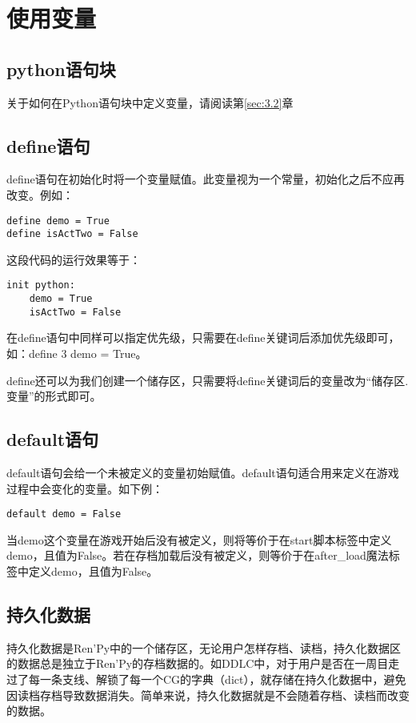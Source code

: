 \section{使用变量}
\subsection{python语句块}
关于如何在Python语句块中定义变量，请阅读第\ref{sec:3.2}章
\subsection{define语句}
define语句在初始化时将一个变量赋值。此变量视为一个常量，初始化之后不应再改变。例如：

\begin{lstlisting}
define demo = True
define isActTwo = False
\end{lstlisting}

这段代码的运行效果等于：
\begin{lstlisting}
init python:
    demo = True
    isActTwo = False
\end{lstlisting}

\begin{ExtraKnowledge}
    在define语句中同样可以指定优先级，只需要在define关键词后添加优先级即可，如：define 3 demo = True。
\end{ExtraKnowledge}

define还可以为我们创建一个储存区，只需要将define关键词后的变量改为“储存区.变量”的形式即可。

\subsection{default语句}
default语句会给一个未被定义的变量初始赋值。default语句适合用来定义在游戏过程中会变化的变量。如下例：
\begin{lstlisting}[numbers=none]
default demo = False
\end{lstlisting}

当demo这个变量在游戏开始后没有被定义，则将等价于在start脚本标签中定义demo，且值为False。若在存档加载后没有被定义，则等价于在after\_load魔法标签中定义demo，且值为False。

\subsection{持久化数据}

持久化数据是Ren'Py中的一个储存区，无论用户怎样存档、读档，持久化数据区的数据总是独立于Ren'Py的存档数据的。如DDLC中，对于用户是否在一周目走过了每一条支线、解锁了每一个CG的字典（dict），就存储在持久化数据中，避免因读档存档导致数据消失。简单来说，持久化数据就是不会随着存档、读档而改变的数据。

